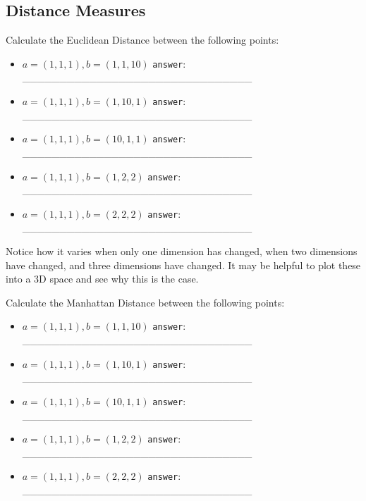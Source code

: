 \documentclass[a4paper,11pt]{scrartcl}
\begin{document}
\subsection{Distance Measures}

Calculate the Euclidean Distance between the following points:

\begin{itemize}
\singlespacing
\item $a = (1,1,1),  b = (1,1,10)$
      \verb|answer|: \_\_\_\_\_\_\_\_\_\_\_\_\_\_\_\_\_\_\_\_\_\_\_\_\_\_\_\_\_\_\_

\item $a = (1,1,1),  b = (1,10,1)$
      \verb|answer|: \_\_\_\_\_\_\_\_\_\_\_\_\_\_\_\_\_\_\_\_\_\_\_\_\_\_\_\_\_\_\_

\item $a = (1,1,1),  b = (10,1,1)$
      \verb|answer|: \_\_\_\_\_\_\_\_\_\_\_\_\_\_\_\_\_\_\_\_\_\_\_\_\_\_\_\_\_\_\_

\item $a = (1,1,1),  b = (1,2,2)$
      \verb|answer|: \_\_\_\_\_\_\_\_\_\_\_\_\_\_\_\_\_\_\_\_\_\_\_\_\_\_\_\_\_\_\_

\item $a = (1,1,1),  b = (2,2,2)$
      \verb|answer|: \_\_\_\_\_\_\_\_\_\_\_\_\_\_\_\_\_\_\_\_\_\_\_\_\_\_\_\_\_\_\_
\end{itemize}

Notice how it varies when only one dimension has changed, when two
dimensions have changed, and three dimensions have changed. It may be helpful
to plot these into a 3D space and see why this is the case.
 

Calculate the Manhattan Distance between the following points:

\begin{itemize}
\singlespacing
\item $a = (1,1,1),  b = (1,1,10)$
      \verb|answer|: \_\_\_\_\_\_\_\_\_\_\_\_\_\_\_\_\_\_\_\_\_\_\_\_\_\_\_\_\_\_\_

\item $a = (1,1,1),  b = (1,10,1)$
      \verb|answer|: \_\_\_\_\_\_\_\_\_\_\_\_\_\_\_\_\_\_\_\_\_\_\_\_\_\_\_\_\_\_\_

\item $a = (1,1,1),  b = (10,1,1)$
      \verb|answer|: \_\_\_\_\_\_\_\_\_\_\_\_\_\_\_\_\_\_\_\_\_\_\_\_\_\_\_\_\_\_\_

\item $a = (1,1,1),  b = (1,2,2)$
      \verb|answer|: \_\_\_\_\_\_\_\_\_\_\_\_\_\_\_\_\_\_\_\_\_\_\_\_\_\_\_\_\_\_\_

\item $a = (1,1,1),  b = (2,2,2)$
      \verb|answer|: \_\_\_\_\_\_\_\_\_\_\_\_\_\_\_\_\_\_\_\_\_\_\_\_\_\_\_\_\_\_\_
\end{itemize}
\end{document}
